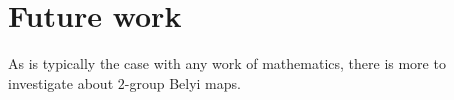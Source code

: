 \documentclass{dcthesis}
\newcommand{\PP}{\mathbb P}
\numberwithin{equation}{section}
\newtheorem{theorem}[equation]{Theorem}
\newtheorem{corr}[equation]{Corollary}
\theoremstyle{definition}
\theoremstyle{remark}
\begin{document}
{{%

\chapter{Future work}{\label{chapter:future}
  As is typically the case with any work of mathematics,
  there is more to investigate about
  $2$-group Belyi maps.
}}}
\end{document}
